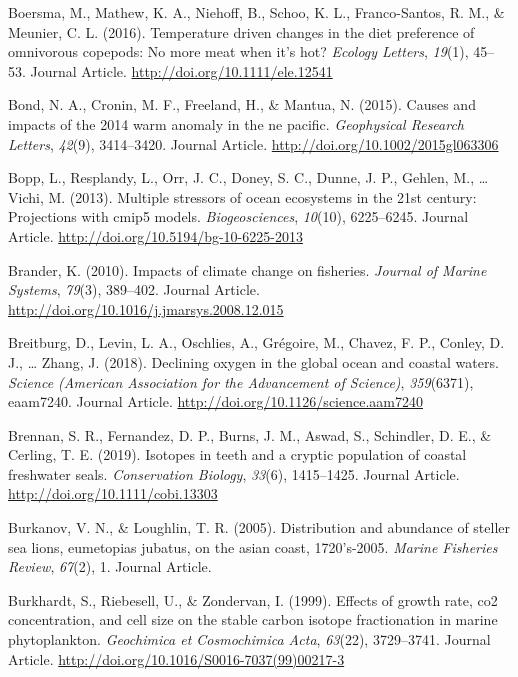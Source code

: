 \documentclass [11pt, proquest] {uwthesis}[2015/03/03]
\begin{document}
\hypertarget{ref-Boersma2015}{}
Boersma, M., Mathew, K. A., Niehoff, B., Schoo, K. L., Franco-Santos, R.
M., \& Meunier, C. L. (2016). Temperature driven changes in the diet
preference of omnivorous copepods: No more meat when it's hot?
\emph{Ecology Letters}, \emph{19}(1), 45--53. Journal Article.
\url{http://doi.org/10.1111/ele.12541}

\hypertarget{ref-Bond2015}{}
Bond, N. A., Cronin, M. F., Freeland, H., \& Mantua, N. (2015). Causes
and impacts of the 2014 warm anomaly in the ne pacific.
\emph{Geophysical Research Letters}, \emph{42}(9), 3414--3420. Journal
Article. \url{http://doi.org/10.1002/2015gl063306}

\hypertarget{ref-Bopp2013}{}
Bopp, L., Resplandy, L., Orr, J. C., Doney, S. C., Dunne, J. P., Gehlen,
M., \ldots{} Vichi, M. (2013). Multiple stressors of ocean ecosystems in
the 21st century: Projections with cmip5 models. \emph{Biogeosciences},
\emph{10}(10), 6225--6245. Journal Article.
\url{http://doi.org/10.5194/bg-10-6225-2013}

\hypertarget{ref-Brander2010}{}
Brander, K. (2010). Impacts of climate change on fisheries.
\emph{Journal of Marine Systems}, \emph{79}(3), 389--402. Journal
Article. \url{http://doi.org/10.1016/j.jmarsys.2008.12.015}

\hypertarget{ref-Brietburg2018}{}
Breitburg, D., Levin, L. A., Oschlies, A., Grégoire, M., Chavez, F. P.,
Conley, D. J., \ldots{} Zhang, J. (2018). Declining oxygen in the global
ocean and coastal waters. \emph{Science (American Association for the
Advancement of Science)}, \emph{359}(6371), eaam7240. Journal Article.
\url{http://doi.org/10.1126/science.aam7240}

\hypertarget{ref-Brennan2019}{}
Brennan, S. R., Fernandez, D. P., Burns, J. M., Aswad, S., Schindler, D.
E., \& Cerling, T. E. (2019). Isotopes in teeth and a cryptic population
of coastal freshwater seals. \emph{Conservation Biology}, \emph{33}(6),
1415--1425. Journal Article. \url{http://doi.org/10.1111/cobi.13303}

\hypertarget{ref-Burkanov2005}{}
Burkanov, V. N., \& Loughlin, T. R. (2005). Distribution and abundance
of steller sea lions, eumetopias jubatus, on the asian coast,
1720's-2005. \emph{Marine Fisheries Review}, \emph{67}(2), 1. Journal
Article.

\hypertarget{ref-Burkhardt1999}{}
Burkhardt, S., Riebesell, U., \& Zondervan, I. (1999). Effects of growth
rate, co2 concentration, and cell size on the stable carbon isotope
fractionation in marine phytoplankton. \emph{Geochimica et Cosmochimica
Acta}, \emph{63}(22), 3729--3741. Journal Article.
\url{http://doi.org/10.1016/S0016-7037(99)00217-3}
\end{document}
